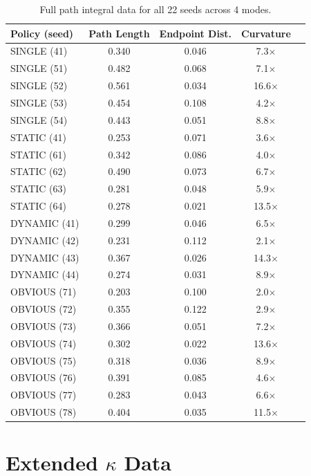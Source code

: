 \documentclass[letterpaper]{article}
\begin{document}
\begin{table}
\centering
\small
\begin{tabular}{lcccc}
\toprule
Policy (seed) & Path Length & Endpoint Dist. & Curvature \\
\midrule
SINGLE (41)   & 0.340 & 0.046 & 7.3$\times$ \\
SINGLE (51)   & 0.482 & 0.068 & 7.1$\times$ \\
SINGLE (52)   & 0.561 & 0.034 & 16.6$\times$ \\
SINGLE (53)   & 0.454 & 0.108 & 4.2$\times$ \\
SINGLE (54)   & 0.443 & 0.051 & 8.8$\times$ \\
STATIC (41)   & 0.253 & 0.071 & 3.6$\times$ \\
STATIC (61)   & 0.342 & 0.086 & 4.0$\times$ \\
STATIC (62)   & 0.490 & 0.073 & 6.7$\times$ \\
STATIC (63)   & 0.281 & 0.048 & 5.9$\times$ \\
STATIC (64)   & 0.278 & 0.021 & 13.5$\times$ \\
DYNAMIC (41)  & 0.299 & 0.046 & 6.5$\times$ \\
DYNAMIC (42)  & 0.231 & 0.112 & 2.1$\times$ \\
DYNAMIC (43)  & 0.367 & 0.026 & 14.3$\times$ \\
DYNAMIC (44)  & 0.274 & 0.031 & 8.9$\times$ \\
OBVIOUS (71)  & 0.203 & 0.100 & 2.0$\times$ \\
OBVIOUS (72)  & 0.355 & 0.122 & 2.9$\times$ \\
OBVIOUS (73)  & 0.366 & 0.051 & 7.2$\times$ \\
OBVIOUS (74)  & 0.302 & 0.022 & 13.6$\times$ \\
OBVIOUS (75)  & 0.318 & 0.036 & 8.9$\times$ \\
OBVIOUS (76)  & 0.391 & 0.085 & 4.6$\times$ \\
OBVIOUS (77)  & 0.283 & 0.043 & 6.6$\times$ \\
OBVIOUS (78)  & 0.404 & 0.035 & 11.5$\times$ \\
\bottomrule
\end{tabular}
\caption{Full path integral data for all 22 seeds across 4 modes.}
\end{table}

\clearpage
\section{Extended $\kappa$ Data}
\end{document}
